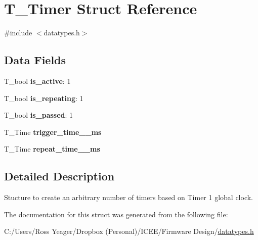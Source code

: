\hypertarget{struct_t___timer}{}\section{T\+\_\+\+Timer Struct Reference}
\label{struct_t___timer}


{\ttfamily \#include $<$datatypes.\+h$>$}

\subsection*{Data Fields}
\begin{DoxyCompactItemize}
\item 
\hypertarget{struct_t___timer_ac6bb00ae6066e48aee4acce07d1a2e78}{}T\+\_\+bool {\bfseries is\+\_\+active}\+: 1\label{struct_t___timer_ac6bb00ae6066e48aee4acce07d1a2e78}

\item 
\hypertarget{struct_t___timer_a1e2024f742e6a1a4658b8155a0645775}{}T\+\_\+bool {\bfseries is\+\_\+repeating}\+: 1\label{struct_t___timer_a1e2024f742e6a1a4658b8155a0645775}

\item 
\hypertarget{struct_t___timer_aca39896b79b2ecbce763571260add838}{}T\+\_\+bool {\bfseries is\+\_\+passed}\+: 1\label{struct_t___timer_aca39896b79b2ecbce763571260add838}

\item 
\hypertarget{struct_t___timer_ac05fdb34d8d2e200fea66de8b7175a19}{}T\+\_\+\+Time {\bfseries trigger\+\_\+time\+\_\+\+\_\+ms}\label{struct_t___timer_ac05fdb34d8d2e200fea66de8b7175a19}

\item 
\hypertarget{struct_t___timer_a13b6a66c9b36d43e9958eef50e871065}{}T\+\_\+\+Time {\bfseries repeat\+\_\+time\+\_\+\+\_\+ms}\label{struct_t___timer_a13b6a66c9b36d43e9958eef50e871065}

\end{DoxyCompactItemize}


\subsection{Detailed Description}
Stucture to create an arbitrary number of timers based on Timer 1 global clock. 

The documentation for this struct was generated from the following file\+:\begin{DoxyCompactItemize}
\item 
C\+:/\+Users/\+Ross Yeager/\+Dropbox (\+Personal)/\+I\+C\+E\+E/\+Firmware Design/\hyperlink{datatypes_8h}{datatypes.\+h}\end{DoxyCompactItemize}
